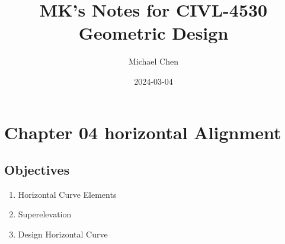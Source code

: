 \documentclass{article}
\title{MK's Notes for CIVL-4530 Geometric Design}
\date{2024-03-04}
\author{Michael Chen}
\begin{document}
  \setcounter{page}{40}


  \tableofcontents
  \newpage


  \setcounter{section}{3}
  \section{Chapter 04 horizontal Alignment}
  \subsection{Objectives}
  \begin{enumerate}
    \item Horizontal Curve Elements
    \item Superelevation
    \item Design Horizontal Curve
  \end{enumerate}

  
\end{document}
